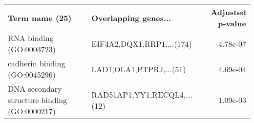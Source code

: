 \begin{tabular}{llr}
\toprule
                              Term name (25) &        Overlapping genes... &  Adjusted p-value \\
\midrule
                    RNA binding (GO:0003723) &   EIF4A2,DQX1,RRP1,...(174) &          4.78e-07 \\
               cadherin binding (GO:0045296) &     LAD1,OLA1,PTPRJ,...(51) &          4.69e-04 \\
DNA secondary structure binding (GO:0000217) & RAD51AP1,YY1,RECQL4,...(12) &          1.09e-03 \\
\bottomrule
\end{tabular}
